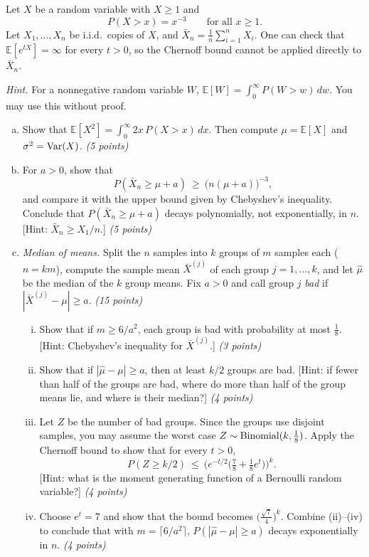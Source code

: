 \documentclass[12pt]{article}
\begin{document}
\begin{enumerate}
Let $X$ be a random variable with $X\ge 1$ and
\[
P(X>x)=x^{-3}\qquad\text{for all } x\ge 1.
\]
Let $X_1,\dots,X_n$ be i.i.d.\ copies of $X$, and $\bar X_n=\frac1n\sum_{i=1}^n X_i$. One can check that $\mathbb{E}[e^{tX}]=\infty$ for every $t>0$, so the Chernoff bound cannot be applied directly to $\bar X_n$.

{\it Hint.} For a nonnegative random variable $W$, $\mathbb{E}[W]=\int_0^\infty P(W>w)\,dw$. You may use this without proof.

\begin{enumerate}[(a)]
\item Show that $\mathbb{E}[X^2]=\int_0^\infty 2x\,P(X>x)\,dx$. Then compute $\mu=\mathbb{E}[X]$ and $\sigma^2={\rm Var}(X)$. {\it (5 points)}

\item For $a>0$, show that
\[
P(\bar X_n\ge\mu+a)\ \ge\ \big(n(\mu+a)\big)^{-3},
\]
and compare it with the upper bound given by Chebyshev's inequality. Conclude that $P(\bar X_n\ge\mu+a)$ decays polynomially, not exponentially, in $n$. [Hint: $\bar X_n\ge X_1/n$.] {\it (5 points)}

\item \emph{Median of means.} Split the $n$ samples into $k$ groups of $m$ samples each ($n=km$), compute the sample mean $\bar X^{(j)}$ of each group $j=1,\dots,k$, and let $\hat\mu$ be the median of the $k$ group means. Fix $a>0$ and call group $j$ \emph{bad} if $|\bar X^{(j)}-\mu|\ge a$. {\it (15 points)}
\begin{enumerate}[i)]
\item Show that if $m\ge 6/a^2$, each group is bad with probability at most $\frac18$. [Hint: Chebyshev's inequality for $\bar X^{(j)}$.] {\it (3 points)}
\item Show that if $|\hat\mu-\mu|\ge a$, then at least $k/2$ groups are bad. [Hint: if fewer than half of the groups are bad, where do more than half of the group means lie, and where is their median?] {\it (4 points)}
\item Let $Z$ be the number of bad groups. Since the groups use disjoint samples, you may assume the worst case $Z\sim{\rm Binomial}(k,\frac18)$. Apply the Chernoff bound to show that for every $t>0$,
\[
P(Z\ge k/2)\ \le\ \Big(e^{-t/2}\big(\tfrac78+\tfrac18 e^{t}\big)\Big)^k.
\]
[Hint: what is the moment generating function of a Bernoulli random variable?] {\it (4 points)}
\item Choose $e^t=7$ and show that the bound becomes $\big(\frac{\sqrt7}{4}\big)^k$. Combine (ii)--(iv) to conclude that with $m=\lceil 6/a^2\rceil$, $P(|\hat\mu-\mu|\ge a)$ decays exponentially in $n$. {\it (4 points)}
\end{enumerate}


\end{enumerate}
\end{enumerate}
\end{document}

